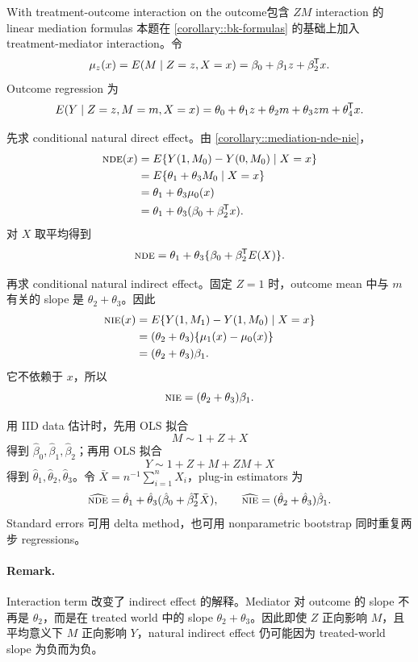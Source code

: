 \begin{exercisesolution}{With treatment-outcome interaction on the outcome}{包含 $ZM$ interaction 的 linear mediation formulas}
本题在 \cref{corollary::bk-formulas} 的基础上加入 treatment-mediator interaction。令
\[
\mu_z(x)=E(M\mid Z=z,X=x)=\beta_0+\beta_1 z+\beta_2^{\mkern-1.5mu\mathsf{T}} x.
\]
Outcome regression 为
\[
E(Y\mid Z=z,M=m,X=x)
=
\theta_0+\theta_1 z+\theta_2 m+\theta_3 zm+\theta_4^{\mkern-1.5mu\mathsf{T}} x.
\]

先求 conditional natural direct effect。由 \cref{corollary::mediation-nde-nie}，
\begin{align*}
\textsc{nde}(x)
&=
E\{Y(1,M_0)-Y(0,M_0)\mid X=x\}\\
&=
E\{\theta_1+\theta_3 M_0\mid X=x\}\\
&=
\theta_1+\theta_3\mu_0(x)\\
&=
\theta_1+\theta_3(\beta_0+\beta_2^{\mkern-1.5mu\mathsf{T}} x).
\end{align*}
对 $X$ 取平均得到
\[
\textsc{nde}
=
\theta_1+\theta_3\{\beta_0+\beta_2^{\mkern-1.5mu\mathsf{T}} E(X)\}.
\]

再求 conditional natural indirect effect。固定 $Z=1$ 时，outcome mean 中与 $m$ 有关的 slope 是 $\theta_2+\theta_3$。因此
\begin{align*}
\textsc{nie}(x)
&=
E\{Y(1,M_1)-Y(1,M_0)\mid X=x\}\\
&=
(\theta_2+\theta_3)\{\mu_1(x)-\mu_0(x)\}\\
&=
(\theta_2+\theta_3)\beta_1.
\end{align*}
它不依赖于 $x$，所以
\[
\textsc{nie}=(\theta_2+\theta_3)\beta_1.
\]

用 IID data 估计时，先用 OLS 拟合
\[
M\sim 1+Z+X
\]
得到 $\hat\beta_0,\hat\beta_1,\hat\beta_2$；再用 OLS 拟合
\[
Y\sim 1+Z+M+ZM+X
\]
得到 $\hat\theta_1,\hat\theta_2,\hat\theta_3$。令 $\bar X=n^{-1}\sum_{i=1}^n X_i$，plug-in estimators 为
\[
\widehat{\textsc{nde}}
=
\hat\theta_1+\hat\theta_3(\hat\beta_0+\hat\beta_2^{\mkern-1.5mu\mathsf{T}}\bar X),
\qquad
\widehat{\textsc{nie}}
=
(\hat\theta_2+\hat\theta_3)\hat\beta_1.
\]
Standard errors 可用 delta method，也可用 nonparametric bootstrap 同时重复两步 regressions。

\paragraph{Remark.}
Interaction term 改变了 indirect effect 的解释。Mediator 对 outcome 的 slope 不再是 $\theta_2$，而是在 treated world 中的 slope $\theta_2+\theta_3$。因此即使 $Z$ 正向影响 $M$，且平均意义下 $M$ 正向影响 $Y$，natural indirect effect 仍可能因为 treated-world slope 为负而为负。
\end{exercisesolution}

